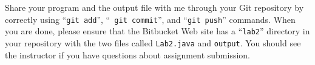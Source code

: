 Share your program and the output file with me through your Git repository by correctly using ``{\tt git add}'', ``{\tt
git commit}'', and ``{\tt git push}'' commands. When you are done, please ensure that the Bitbucket Web site has
a ``{\tt lab2}'' directory in your repository with the two files called {\tt Lab2.java} and {\tt output}. You should see 
the instructor if you have questions about assignment submission.


